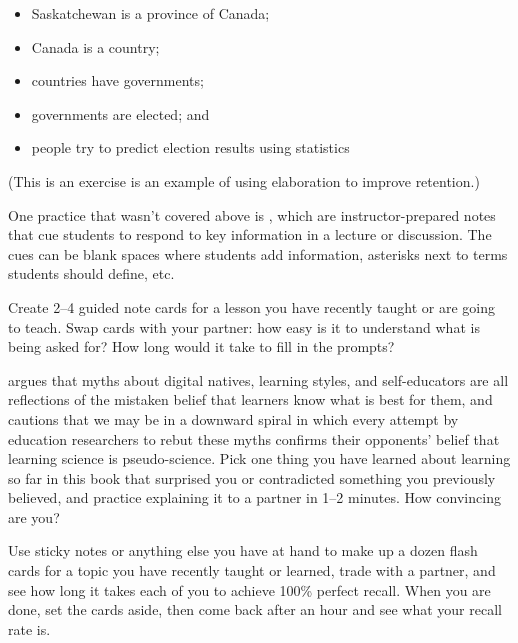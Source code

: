 \begin{itemize}
\item
  Saskatchewan is a province of Canada;
\item
  Canada is a country;
\item
  countries have governments;
\item
  governments are elected; and
\item
  people try to predict election results using statistics
\end{itemize}

(This is an exercise is an example of using elaboration to improve
retention.)


One practice that wasn't covered above is
, which are instructor-prepared
notes that cue students to respond to key information in a lecture or
discussion.  The cues can be blank spaces where students add
information, asterisks next to terms students should define, etc.

Create 2--4 guided note cards for a lesson you have recently taught or
are going to teach.  Swap cards with your partner: how easy is it to
understand what is being asked for?  How long would it take to fill in
the prompts?


\cite{Kirs2013} argues that myths about digital natives, learning
styles, and self-educators are all reflections of the mistaken belief
that learners know what is best for them, and cautions that we may be
in a downward spiral in which every attempt by education researchers
to rebut these myths confirms their opponents' belief that learning
science is pseudo-science.  Pick one thing you have learned about
learning so far in this book that surprised you or contradicted
something you previously believed, and practice explaining it to a
partner in 1--2 minutes.  How convincing are you?


Use sticky notes or anything else you have at hand to make up a dozen
flash cards for a topic you have recently taught or learned, trade
with a partner, and see how long it takes each of you to achieve 100\%
perfect recall.  When you are done, set the cards aside, then come
back after an hour and see what your recall rate is.


